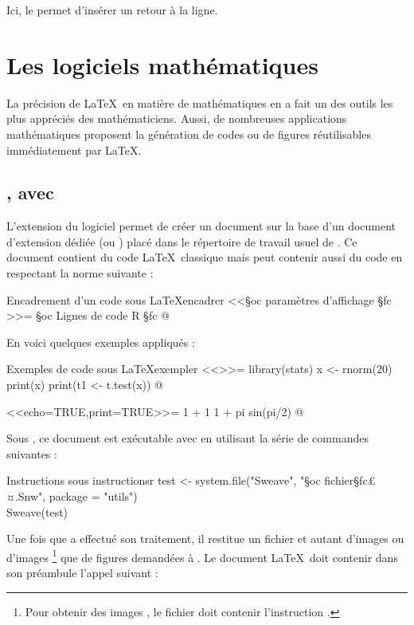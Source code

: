 Ici, le  permet d'insérer un retour à la ligne.

\section{Les logiciels mathématiques}

La précision de \LaTeX\ en matière de mathématiques en a fait un des outils les plus appréciés des mathématiciens. Aussi, de nombreuses applications mathématiques proposent la génération de codes ou de figures réutilisables immédiatement par \LaTeX.


\subsection{, avec }

L'extension  du logiciel  permet de créer un document  sur la base d'un document d'extension dédiée  (ou ) placé dans le répertoire de travail usuel de . Ce document contient du code \LaTeX\ classique mais peut contenir aussi du code  en respectant la norme suivante :

\begin{codesimple}{Encadrement d'un code  sous \LaTeX}{encadrer}
<<§oc paramètres d'affichage §fc >>= 
§oc Lignes de code R §fc
@
\end{codesimple}


En voici quelques exemples appliqués :

\begin{codesimple}{Exemples de code  sous \LaTeX}{exempler}
<<>>=  
library(stats)
x <- rnorm(20)
print(x)
print(t1 <- t.test(x))
@ 

<<echo=TRUE,print=TRUE>>= 
1 + 1          
1 + pi        
sin(pi/2) 
@
\end{codesimple}


Sous , ce document est exécutable avec  en utilisant la série de commandes suivantes :

\begin{codesimple}{Instructions sous }{instructionsr}
test <- system.file("Sweave", "§oc fichier§fc£¤.Snw", package = "utils")  \\
Sweave(test)
\end{codesimple}


Une fois que  a effectué son traitement, il restitue un fichier  et autant d'images  ou d'images \footnote{Pour obtenir des images , le fichier  doit contenir l'instruction .} que de figures demandées à . Le document \LaTeX\ doit contenir dans son préambule l'appel suivant :

